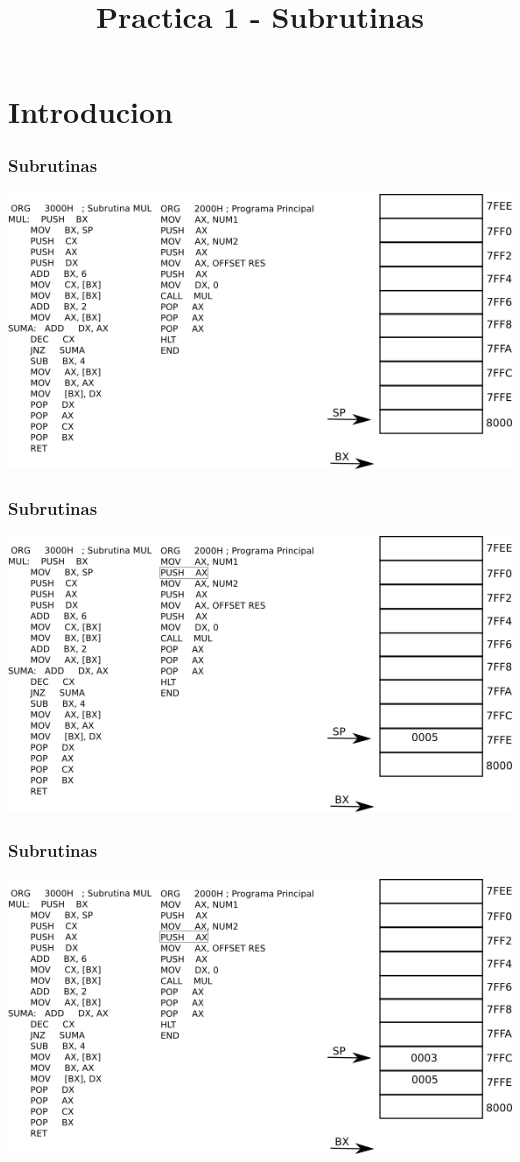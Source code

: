 \documentclass{beamer}
\title{Practica 1 - Subrutinas}
\begin{document}
\begin{frame}
\titlepage
\end{frame}

\section{Introducion}

\begin{frame}
\frametitle{Subrutinas}
\includegraphics[scale=0.70]{imgs/imagen_001.png}
\end{frame}

\begin{frame}
\frametitle{Subrutinas}
\includegraphics[scale=0.70]{imgs/imagen_002.png}
\end{frame}

\begin{frame}
\frametitle{Subrutinas}
\includegraphics[scale=0.70]{imgs/imagen_003.png}
\end{frame}
\end{document}
